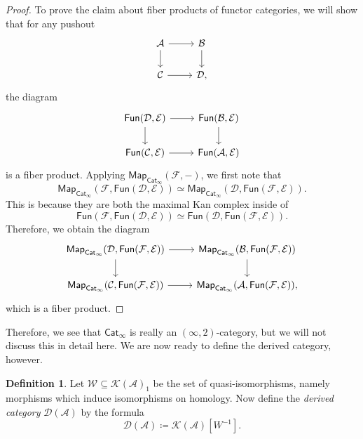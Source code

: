 \documentclass[10pt, oneside]{memoir}
\theoremstyle{definition}
\newtheorem{defn}[thm]{Definition}
\theoremstyle{remark}
\theoremstyle{plain}
\theoremstyle{definition}
\theoremstyle{remark}
\newcommand{\mc}[1]{\mathcal{#1}}
\newcommand{\ms}[1]{\mathsf{#1}}
\newcommand{\1}{\mathbf{1}}
\newcommand{\2}{\mathbf{2}}
\newcommand{\3}{\mathbf{3}}
\begin{document}
\begin{proof}
    To prove the claim about fiber products of functor categories, we will show that for any pushout
    \begin{equation*}
    \begin{tikzcd}
        \mc{A} \ar{r} \ar{d} & \mc{B} \ar{d} \\
        \mc{C} \ar{r} & \mc{D},
    \end{tikzcd}
    \end{equation*}
    the diagram
    \begin{equation*}
    \begin{tikzcd}
        \ms{Fun}(\mc{D}, \mc{E}) \ar{r} \ar{d} & \ms{Fun}(\mc{B}, \mc{E}) \ar{d} \\
        \ms{Fun}(\mc{C}, \mc{E}) \ar{r} & \ms{Fun}(\mc{A}, \mc{E})
    \end{tikzcd}
    \end{equation*}
    is a fiber product. Applying \(\ms{Map}_{\ms{Cat}_{\infty}}(\mc{F}, -) \), we first note that
    \[ \ms{Map}_{\ms{Cat}_{\infty}}(\mc{F}, \ms{Fun}(\mc{D}, \mc{E})) \simeq \ms{Map}_{\ms{Cat}_{\infty}}(\mc{D}, \ms{Fun}(\mc{F}, \mc{E})). \]
    This is because they are both the maximal Kan complex inside of
    \[ \ms{Fun}(\mc{F}, \ms{Fun}(\mc{D}, \mc{E})) \simeq \ms{Fun}(\mc{D}, \ms{Fun}(\mc{F}, \mc{E})). \]
    Therefore, we obtain the diagram
    \begin{equation*}
    \begin{tikzcd}
        \ms{Map}_{\ms{Cat}_{\infty}}(\mc{D}, \ms{Fun}(\mc{F}, \mc{E})) \ar{r} \ar{d} & \ms{Map}_{\ms{Cat}_{\infty}}(\mc{B}, \ms{Fun}(\mc{F}, \mc{E}))  \ar{d} \\
        \ms{Map}_{\ms{Cat}_{\infty}}(\mc{C}, \ms{Fun}(\mc{F}, \mc{E})) \ar{r} & \ms{Map}_{\ms{Cat}_{\infty}}(\mc{A}, \ms{Fun}(\mc{F}, \mc{E})),
    \end{tikzcd}
    \end{equation*}
    which is a fiber product.
\end{proof}

Therefore, we see that \(\ms{Cat}_{\infty} \) is really an \((\infty, 2) \)-category, but we will not discuss this in detail here. We are now ready to define the derived category, however.

\begin{defn}
    Let \(\mc{W} \subseteq \mc{K}(\mc{A})_1 \) be the set of quasi-isomorphisms, namely morphisms which induce isomorphisms on homology. Now define the \textit{derived category} \(\mc{D}(\mc{A}) \) by the formula
    \[ \mc{D}(\mc{A}) \coloneqq \mc{K}(\mc{A})[W^{-1}]. \]
\end{defn}
\end{document}
